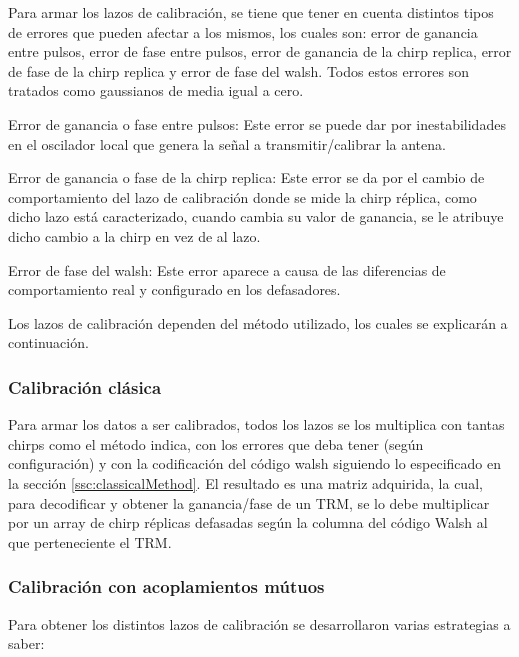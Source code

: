 Para armar los lazos de calibración, se tiene que tener en cuenta distintos tipos de errores que pueden afectar a los mismos, 
los cuales son: error de ganancia entre pulsos, error de fase entre pulsos, error de ganancia de la chirp replica, error de 
fase de la chirp replica y error de fase del walsh. Todos estos errores son tratados como gaussianos de media igual a cero.

Error de ganancia o fase entre pulsos: Este error se puede dar por inestabilidades en el oscilador local que genera la señal a 
transmitir/calibrar la antena.

Error de ganancia o fase de la chirp replica: Este error se da por el cambio de comportamiento del lazo de calibración donde se
mide la chirp réplica, como dicho lazo está caracterizado, cuando cambia su valor de ganancia, se le atribuye dicho cambio a la
chirp en vez de al lazo.

Error de fase del walsh: Este error aparece a causa de las diferencias de comportamiento real y configurado en los defasadores. 

Los lazos de calibración dependen del método utilizado, los cuales se explicarán a continuación.

\subsubsection{Calibración clásica}
Para armar los datos a ser calibrados, todos los lazos se los multiplica con tantas chirps como el método indica, con los errores
que deba tener (según configuración) y con la codificación del código walsh siguiendo lo especificado en la sección 
\ref{ssc:classicalMethod}. El resultado es una matriz adquirida, la cual, para decodificar y obtener la ganancia/fase de un TRM,
se lo debe multiplicar por un array de chirp réplicas defasadas según la columna del código Walsh al que perteneciente el TRM. 

\subsubsection{Calibración con acoplamientos mútuos}

Para obtener los distintos lazos de calibración se desarrollaron varias estrategias a saber: 

